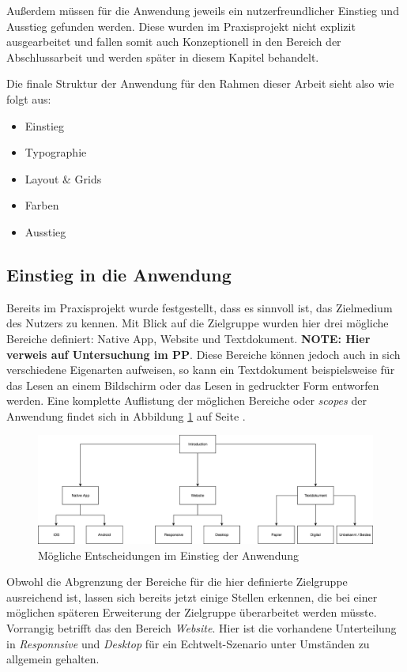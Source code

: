 Außerdem müssen für die Anwendung jeweils ein nutzerfreundlicher Einstieg und Ausstieg gefunden werden. Diese wurden im Praxisprojekt nicht explizit ausgearbeitet und fallen somit auch Konzeptionell in den Bereich der Abschlussarbeit und werden später in diesem Kapitel behandelt.

Die finale Struktur der Anwendung für den Rahmen dieser Arbeit sieht also wie folgt aus:

\begin{itemize}
  \item Einstieg
  \item Typographie
  \item Layout \& Grids
  \item Farben
  \item Ausstieg
\end{itemize}

\subsection{Einstieg in die Anwendung}
Bereits im Praxisprojekt wurde festgestellt, dass es sinnvoll ist, das Zielmedium des Nutzers zu kennen. Mit Blick auf die Zielgruppe wurden hier drei mögliche Bereiche definiert: Native App, Website und Textdokument. \textbf{NOTE: Hier verweis auf Untersuchung im PP}. Diese Bereiche können jedoch auch in sich verschiedene Eigenarten aufweisen, so kann ein Textdokument beispielsweise für das Lesen an einem Bildschirm oder das Lesen in gedruckter Form entworfen werden. Eine komplette Auflistung der möglichen Bereiche oder \textit{scopes} der Anwendung findet sich in Abbildung \ref{fig:intro} auf Seite \pageref{fig:intro}.

\begin{figure}[h]
    \centering
    \includegraphics[width=1\textwidth]{images/ablauf_intro.png}
    \caption{Mögliche Entscheidungen im Einstieg der Anwendung}
    \label{fig:intro}
\end{figure}

Obwohl die Abgrenzung der Bereiche für die hier definierte Zielgruppe ausreichend ist, lassen sich bereits jetzt einige Stellen erkennen, die bei einer möglichen späteren Erweiterung der Zielgruppe überarbeitet werden müsste. Vorrangig betrifft das den Bereich \textit{Website}. Hier ist die vorhandene Unterteilung in \textit{Responnsive} und \textit{Desktop} für ein Echtwelt-Szenario unter Umständen zu allgemein gehalten.

